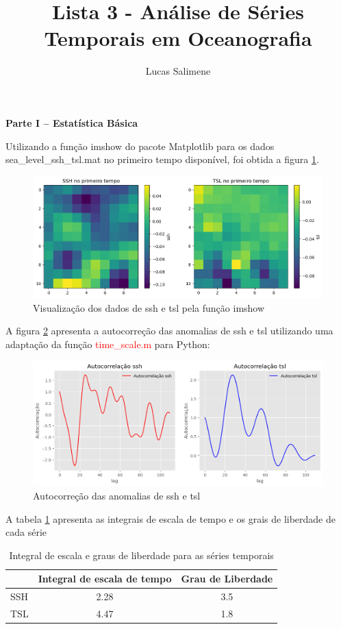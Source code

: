 \documentclass[12pt,a4paper,portuguese]{article}
\title{Lista 3 - Análise de Séries Temporais em Oceanografia}
\author{Lucas Salimene}
\date{}
\begin{document}
	\maketitle
	\newpage
	
	\textbf{Parte I – Estatística Básica}
	
	Utilizando a função imshow do pacote Matplotlib para os dados sea\_level\_ssh\_tsl.mat no primeiro tempo disponível, foi obtida a figura \ref{fig:lista3-1a}.
	
	
\begin{figure}[H]
	\centering
	\includegraphics[width=0.9\linewidth]{lista3-1a}
	\caption{Visualização dos dados de ssh e tsl pela função imshow}
	\label{fig:lista3-1a}
\end{figure}

A figura \ref{fig:lista3-1b} apresenta a autocorreção das anomalias de ssh e tsl utilizando uma adaptação da função \textcolor{red}{time\_scale.m} para Python:

\begin{figure}[H]
	\centering
	\includegraphics[width=0.9\linewidth]{lista3-1b}
	\caption{Autocorreção das anomalias de ssh e tsl}
	\label{fig:lista3-1b}
\end{figure}
A tabela \ref{tsarr} apresenta as integrais de escala de tempo e os grais de liberdade de cada série

\begin{table}[H]
	\centering
	\begin{tabular}{l|c|c|}
		\cline{2-3}
		& \multicolumn{1}{l|}{Integral de escala de tempo} & \multicolumn{1}{l|}{Grau de Liberdade} \\ \hline
		\multicolumn{1}{|l|}{SSH} & 2.28                                             & 3.5                                    \\ \hline
		\multicolumn{1}{|l|}{TSL} & 4.47                                             & 1.8                                    \\ \hline
	\end{tabular}
	\caption{Integral de escala e graus de liberdade para as séries temporais}
	\label{tsarr}
\end{table}
\end{document}

